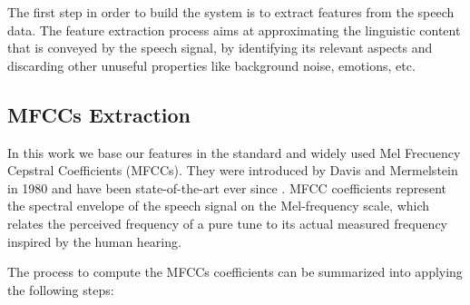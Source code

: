 The first step in order to build the system is to extract features from the speech data.
The feature extraction process aims at approximating the linguistic content that is conveyed
by the speech signal, by identifying its relevant aspects and discarding other unuseful
properties like background noise, emotions, etc.

\subsection{MFCCs Extraction}
In this work we base our features in the standard and widely used Mel Frecuency
Cepstral Coefficients (MFCCs). They were introduced by Davis and Mermelstein in 1980 and
have been state-of-the-art ever since \cite{mfcc_foundational}.
MFCC coefficients represent the spectral envelope of the speech signal on the Mel-frequency scale,
which relates the perceived frequency of a pure tune to its actual measured frequency inspired
by the human hearing.

The process to compute the MFCCs coefficients can be summarized into applying the following steps:


